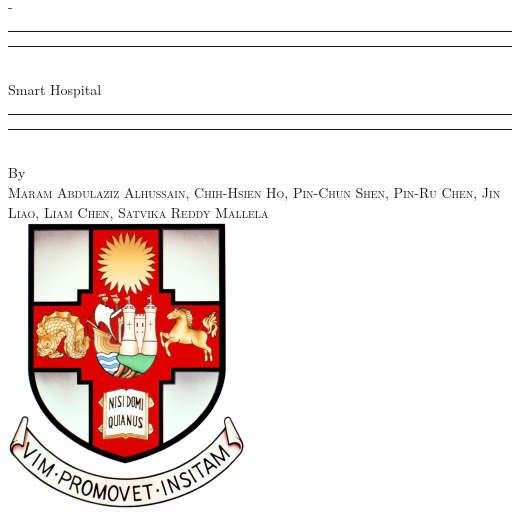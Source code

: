 %
%
%
%
%
\begin{titlingpage}
\begin{SingleSpace}
\calccentering{\unitlength}
\begin{adjustwidth*}{\unitlength}{-\unitlength}
\vspace*{13mm}
\begin{center}
\rule[0.5ex]{\linewidth}{2pt}\vspace*{-\baselineskip}\vspace*{3.2pt}
\rule[0.5ex]{\linewidth}{1pt}\\[\baselineskip]
{\HUGE Smart Hospital }\\[4mm]
\rule[0.5ex]{\linewidth}{1pt}\vspace*{-\baselineskip}\vspace{3.2pt}
\rule[0.5ex]{\linewidth}{2pt}\\
\vspace{6.5mm}
{\large By}\\
\vspace{6.5mm}
{\large\textsc{Maram Abdulaziz Alhussain, Chih-Hsien Ho, Pin-Chun Shen, Pin-Ru Chen, Jin Liao, Liam Chen, Satvika Reddy Mallela}}\\
\vspace{11mm}
\includegraphics[scale=0.6]{logos/bristolcrest_colour}\\

\end{center}
\end{adjustwidth*}
\end{SingleSpace}
\end{titlingpage}
